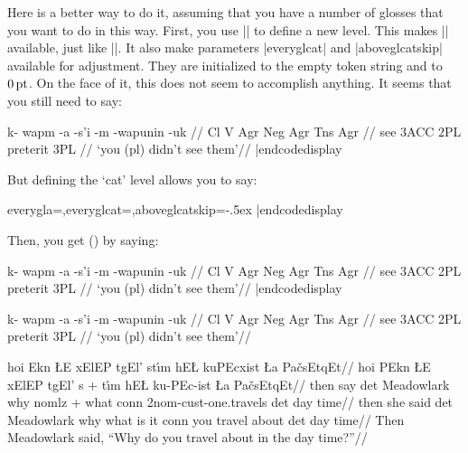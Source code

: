 Here is a better way to do it, assuming that you have a number of
glosses that you want to do in this way.  First, you use
|| to define a new level.  This makes |\glcat|
available, just like |\glb|.  It also make parameters |everyglcat| and
|aboveglcatskip| available for adjustment.  They are initialized to
the empty token string and to $0\,\rm pt$.  On the face of it, this
does not seem to accomplish anything.  It seems that you still need to
say:

\codedisplay
\ex
\begingl
\gla[everygla=] k- wapm -a -s'i -m -wapunin -uk //
\glcat[everyglcat=\tenrm,aboveglcatskip=-.5ex] Cl V Agr Neg Agr Tns Agr //
 see {3\sc ACC} {} 2{\sc PL} preterit 3{\sc PL} //
\glft `you (pl) didn't see them'//
\endgl
\xe
|endcodedisplay

But defining the `cat' level allows you to say:

\codedisplay
{}
   {everygla=,everyglcat=\tenrm,aboveglcatskip=-.5ex}
|endcodedisplay

Then, you get (\lastx) by saying:

\codedisplay
\ex[lingstyle=Potawatomi]
\begingl
\gla k- wapm -a -s'i -m -wapunin -uk //
\glcat Cl V Agr Neg Agr Tns Agr //
 see {3\sc ACC} {} 2{\sc PL} preterit 3{\sc PL} //
\glft `you (pl) didn't see them'//
\endgl
\xe
|endcodedisplay

\ex[lingstyle=Potawatomi]
\begingl
\gla k- wapm -a -s'i -m -wapunin -uk //
\glcat Cl V Agr Neg Agr Tns Agr //
 see {3\sc ACC} {} 2{\sc PL} preterit 3{\sc PL} //
\glft `you (pl) didn't see them'//
\endgl
\xe










\framedisplay
\ex
\begingl
\gla hoi Ekn {\L}E {x\W}ElEP t{g\W}El' st{\'\i}m {hE\L}
   {kuPEcx\W ist} {\L a} Pa{\v c}sEtqEt//
\glaa hoi {\mroot}PEkn {\L}E {x\W}ElEP t{g\W}El' {s +
   \mroot t\'\i m} {hE\L} ku-PEc-ist {\L}a Pa{\v c}sEtqEt//
\glb then {\mroot}say det Meadowlark why {nomlz + \mroot what} conn
   2nom-cust-{\mroot}one.travels det {day time}//
\glb then {she said} det Meadowlark why {what is it} conn {you travel
   about} det {day time}//
\glft Then Meadowlark said, ``Why do you travel about in the day
   time?''//
\endgl
\xe
\endframedisplay




